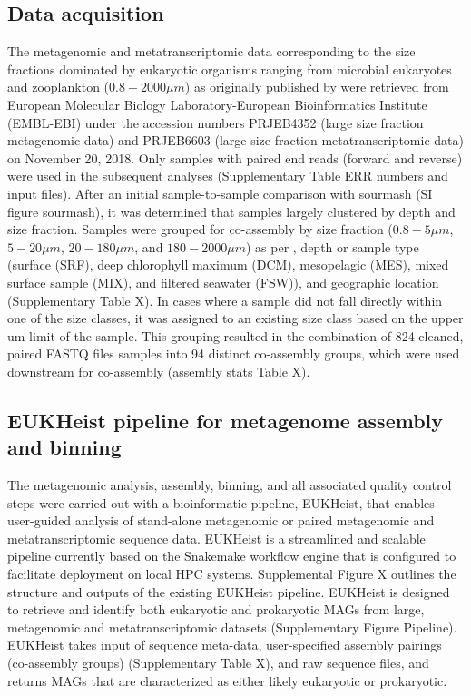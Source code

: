 \documentclass[12pt]{article}
\numberwithin{equation}{section}
\begin{document}
\subsection*{Data acquisition} The metagenomic and metatranscriptomic data corresponding to the size fractions dominated by eukaryotic organisms ranging from ﻿microbial eukaryotes and zooplankton ($0.8 -  2000 \mu m$) as originally published by \citet{Carradec2018global} were retrieved from ﻿European Molecular Biology Laboratory-European Bioinformatics Institute (EMBL-EBI) under the accession numbers PRJEB4352 (large size fraction metagenomic data) and PRJEB6603 (large size fraction metatranscriptomic data) on November 20, 2018. Only samples with paired end reads (forward and reverse) were used in the subsequent analyses (Supplementary Table ERR numbers and input files). After an initial sample-to-sample comparison with sourmash (SI figure sourmash), it was determined that samples largely clustered by depth and size fraction. Samples were grouped for co-assembly by size fraction ($0.8 - 5 \mu m$, $5-20 \mu m$, $20-180 \mu m$, and $180-2000 \mu m$) as per \citet{Carradec2018global}, depth or sample type (surface (SRF), deep chlorophyll maximum (DCM), mesopelagic (MES), mixed surface sample (MIX), and filtered seawater (FSW)), and geographic location (Supplementary Table X). In cases where a sample did not fall directly within one of the size classes, it was assigned to an existing size class based on the upper um limit of the sample. This grouping resulted in the combination of 824 cleaned, paired FASTQ files samples into 94 distinct co-assembly groups, which were used downstream for co-assembly (assembly stats Table X). 

\subsection*{EUKHeist pipeline for metagenome assembly and binning}The metagenomic analysis, assembly, binning, and all associated quality control steps were carried out with a bioinformatic pipeline, EUKHeist, that enables user-guided analysis of stand-alone metagenomic or paired metagenomic and metatranscriptomic sequence data. EUKHeist is a streamlined and scalable pipeline currently based on the Snakemake workflow engine \citep{Koster2012} that is configured to facilitate deployment on local HPC systems.  Supplemental Figure X outlines the structure and outputs of the existing EUKHeist pipeline. EUKHeist is designed to retrieve and identify both eukaryotic and prokaryotic MAGs from large, metagenomic and metatranscriptomic datasets (Supplementary Figure Pipeline). EUKHeist takes input of sequence meta-data, user-specified assembly pairings (co-assembly groups) (Supplementary Table X), and raw sequence files, and returns MAGs that are characterized as either likely eukaryotic or prokaryotic. 
\end{document}
